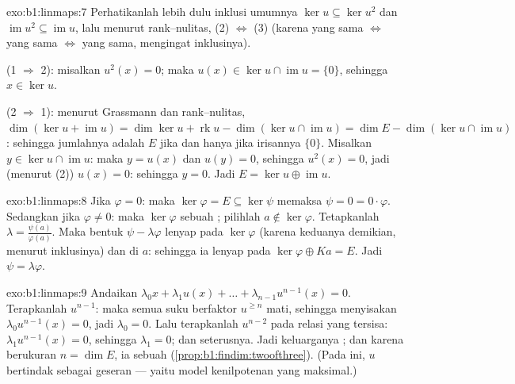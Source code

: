 \begin{solution}{exo:b1:linmaps:7}
Perhatikanlah lebih dulu inklusi umumnya $\ker u \subseteq \ker u^2$ dan
$\operatorname{im} u^2 \subseteq \operatorname{im} u$, lalu menurut
rank--nulitas, (2) $\iff$ (3) (karena  yang sama $\iff$  yang sama
$\iff$  yang sama, mengingat inklusinya).

(1 $\Rightarrow$ 2): misalkan $u^2(x) = 0$; maka $u(x) \in \ker u \cap
\operatorname{im} u = \{0\}$, sehingga $x \in \ker u$.

(2 $\Rightarrow$ 1): menurut Grassmann dan rank--nulitas, $\dim(\ker u +
\operatorname{im} u) = \dim\ker u + \operatorname{rk} u -
\dim(\ker u \cap \operatorname{im} u) = \dim E - \dim(\ker u \cap
\operatorname{im} u)$: sehingga jumlahnya adalah $E$ jika dan hanya jika irisannya
$\{0\}$. Misalkan $y \in \ker u \cap \operatorname{im} u$: maka $y = u(x)$ dan
$u(y) = 0$, sehingga $u^2(x) = 0$, jadi (menurut (2)) $u(x) = 0$: sehingga $y = 0$. Jadi
$E = \ker u \oplus \operatorname{im} u$.
\end{solution}

\begin{solution}{exo:b1:linmaps:8}
Jika $\varphi = 0$: maka $\ker\varphi = E \subseteq \ker\psi$ memaksa
$\psi = 0 = 0\cdot\varphi$. Sedangkan jika $\varphi \neq 0$: maka $\ker\varphi$ sebuah
; pilihlah $a \notin \ker\varphi$. Tetapkanlah $\lambda =
\frac{\psi(a)}{\varphi(a)}$. Maka bentuk $\psi - \lambda\varphi$
lenyap pada $\ker\varphi$ (karena keduanya demikian, menurut inklusinya) dan di $a$:
sehingga ia lenyap pada $\ker\varphi \oplus Ka = E$. Jadi $\psi =
\lambda\varphi$.
\end{solution}

\begin{solution}{exo:b1:linmaps:9}
Andaikan $\lambda_0 x + \lambda_1 u(x) + \dots + \lambda_{n-1}
u^{n-1}(x) = 0$. Terapkanlah $u^{n-1}$: maka semua suku berfaktor $u^{\geq
n}$ mati, sehingga menyisakan $\lambda_0 u^{n-1}(x) = 0$, jadi $\lambda_0 = 0$.
Lalu terapkanlah $u^{n-2}$ pada relasi yang tersisa: $\lambda_1 u^{n-1}(x) =
0$, sehingga $\lambda_1 = 0$; dan seterusnya. Jadi keluarganya ; dan karena berukuran
$n = \dim E$, ia sebuah  (\cref{prop:b1:findim:twoofthree}). (Pada
 ini, $u$ bertindak sebagai geseran --- yaitu model kenilpotenan
yang maksimal.)
\end{solution}

